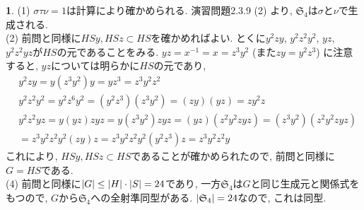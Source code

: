 \documentclass{article}
\theoremstyle{definition}
\newtheorem{ans}{}
\numberwithin{ans}{subsection}
\DeclarePairedDelimiter{\order}{\lvert}{\rvert}
\begin{document}
\begin{ans}
  (1) $\sigma\tau\nu = 1$は計算により確かめられる.
  演習問題2.3.9 (2) より, $\mathfrak{S}_4$は$\sigma$と$\nu$で生成される.\\
  (2) 前問と同様に$HSy, HSz \subset HS$を確かめればよい.
  とくに$y^2zy$, $y^2z^2y^2$, $yz$, $y^2z^2yz$が$HS$の元であることをみる.
  $yz = x^{-1} = x = z^3y^2$ (また$zy = y^2z^3$)  に注意すると,
  $yz$については明らかに$HS$の元であり,\\
  \begin{align*}
    &y^2zy = y(z^3y^2)y = yz^3 = z^3y^2z^2 \\
    &y^2z^2y^2 = y^2z^6y^2 = (y^2z^3)(z^3y^2) = (zy)(yz) = zy^2z \\
    &y^2z^2yz = y(yz)zyz = y(z^3y^2)zyz = (yz)(z^2y^2zyz) = (z^3y^2)(z^2y^2zyz) \\
    &= z^3y^2z^2y^2(zy)z = z^3y^2z^2y^2(y^2z^3)z = z^3y^2z^2y
  \end{align*}
  これにより, $HSy, HSz \subset HS$であることが確かめられたので,
  前問と同様に$G = HS$である.\\
  (4) 前問と同様に$\order{G} \le \order{H} \cdot \order{S} = 24$であり,
  一方$\mathfrak{S}_4$は$G$と同じ生成元と関係式をもつので, $G$から$\mathfrak{S}_4$への全射準同型がある.
  $\order{\mathfrak{S}_4} = 24$なので, これは同型.
\end{ans}
\end{document}
